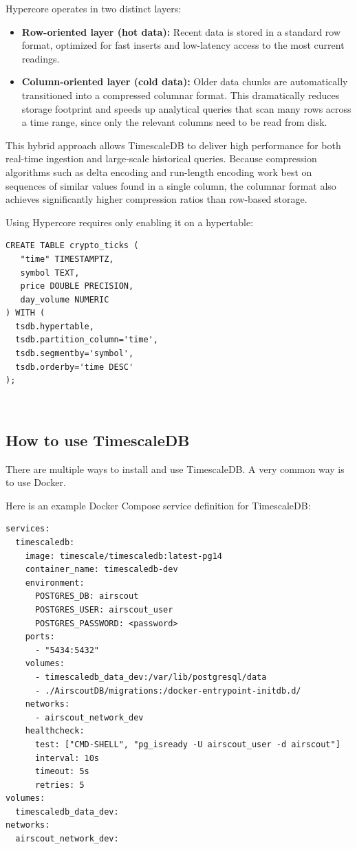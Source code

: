 Hypercore operates in two distinct layers:
\begin{itemize}
  \item \textbf{Row-oriented layer (hot data):} Recent data is stored in a standard row format, optimized for fast inserts and low-latency access to the most current readings.
  \item \textbf{Column-oriented layer (cold data):} Older data chunks are automatically transitioned into a compressed columnar format. This dramatically reduces storage footprint and speeds up analytical queries that scan many rows across a time range, since only the relevant columns need to be read from disk.
\end{itemize}

This hybrid approach allows TimescaleDB to deliver high performance for both
real-time ingestion and large-scale historical queries. Because compression
algorithms such as delta encoding and run-length encoding work best on
sequences of similar values found in a single column, the columnar format also
achieves significantly higher compression ratios than row-based storage.

Using Hypercore requires only enabling it on a hypertable:

\begin{lstlisting}[language=PGTSSQL, caption={Enabling Hypercore on a TimescaleDB hypertable.}, label={lst:timescaledb-hypercore}]
CREATE TABLE crypto_ticks (
   "time" TIMESTAMPTZ,
   symbol TEXT,
   price DOUBLE PRECISION,
   day_volume NUMERIC
) WITH (
  tsdb.hypertable,
  tsdb.partition_column='time',
  tsdb.segmentby='symbol', 
  tsdb.orderby='time DESC'
);
\end{lstlisting}
~\cite[TimescaleDB Hypercore]{TimescaleDB:04}

\subsection{How to use TimescaleDB}

There are multiple ways to install and use TimescaleDB\@. A very common way is
to use Docker.

Here is an example Docker Compose service definition for TimescaleDB\@:

\begin{lstlisting}[style=yaml, caption={Docker-compose service definition for TimescaleDB.}, label={lst:docker-timescaledb}]
services:
  timescaledb:
    image: timescale/timescaledb:latest-pg14
    container_name: timescaledb-dev
    environment:
      POSTGRES_DB: airscout
      POSTGRES_USER: airscout_user
      POSTGRES_PASSWORD: <password>
    ports:
      - "5434:5432"
    volumes:
      - timescaledb_data_dev:/var/lib/postgresql/data
      - ./AirscoutDB/migrations:/docker-entrypoint-initdb.d/
    networks:
      - airscout_network_dev
    healthcheck:
      test: ["CMD-SHELL", "pg_isready -U airscout_user -d airscout"]
      interval: 10s
      timeout: 5s
      retries: 5
volumes:
  timescaledb_data_dev:
networks:
  airscout_network_dev:
\end{lstlisting}

